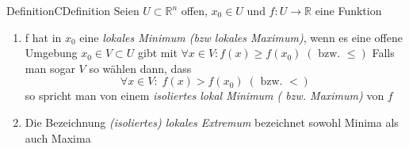 \begin{ibox}[]{Definition}{CDefinition}
    Seien $ U \subset \mathbb{R}^n  $ offen, $ x_0 \in U $ und $ f: U \to \mathbb{R}  $ eine Funktion 
	\begin{enumerate}[label=\alph*)]
		\item f hat in $ x_0 $ eine \textit{lokales Minimum (bzw lokales Maximum)}, wenn es eine offene Umgebung $ x_0 \in V \subset U $ 
			gibt mit $ \forall x \in V : f \left(x\right) \geq  f \left(x_0\right) \; \left( \text{ bzw. } \leq  \right)  $ 
			Falls man sogar $ V $ so wählen dann, dass 
			$$ \forall x \in V : \; f \left(x\right)  > f \left(x_0\right) \; \left( \text{ bzw. } <  \right)  $$
			so spricht man von einem \textit{isoliertes lokal Minimum ( bzw. Maximum)} von $ f $ 
		\item Die Bezeichnung \textit{ (isoliertes) lokales Extremum } bezeichnet sowohl Minima als auch Maxima 
	\end{enumerate}
\end{ibox}
				
